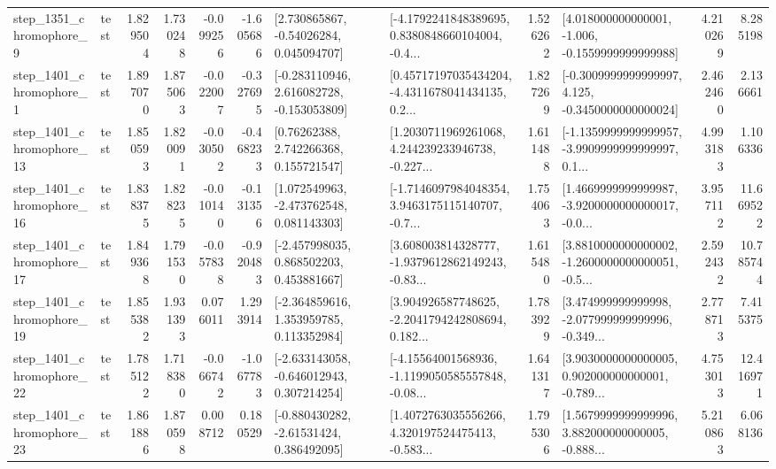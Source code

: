 \begin{tabular}{llrrrrllrlrr}
  step\_1351\_chromophore\_9 &      test &      1.829504 &    1.730248 &     -0.099256 & -1.605686 &     [2.730865867, -0.54026284, 0.045094707] &  [-4.1792241848389695, 0.8380848660104004, -0.4... &       1.526262 &   [4.018000000000001, -1.006, -0.1559999999999988] &            4.210269 &          8.285198 \\
  step\_1401\_chromophore\_1 &      test &      1.897070 &    1.875063 &     -0.022007 & -0.327695 &   [-0.283110946, 2.616082728, -0.153053809] &  [0.45717197035434204, -4.4311678041434135, 0.2... &       1.827269 &  [-0.3009999999999997, 4.125, -0.3450000000000024] &            2.462460 &          2.136661 \\
 step\_1401\_chromophore\_13 &      test &      1.850593 &    1.820091 &     -0.030502 & -0.468233 &      [0.76262388, 2.742266368, 0.155721547] &  [1.2030711969261068, 4.244239233946738, -0.227... &       1.611488 &  [-1.1359999999999957, -3.9909999999999997, 0.1... &            4.993183 &          1.106336 \\
 step\_1401\_chromophore\_16 &      test &      1.838375 &    1.828235 &     -0.010140 & -0.131356 &    [1.072549963, -2.473762548, 0.081143303] &  [-1.7146097984048354, 3.9463175115140707, -0.7... &       1.754063 &  [1.4669999999999987, -3.9200000000000017, -0.0... &            3.957112 &         11.669522 \\
 step\_1401\_chromophore\_17 &      test &      1.849368 &    1.791530 &     -0.057838 & -0.920483 &    [-2.457998035, 0.868502203, 0.453881667] &  [3.608003814328777, -1.9379612862149243, -0.83... &       1.615480 &  [3.8810000000000002, -1.2600000000000051, -0.5... &            2.592432 &         10.785744 \\
 step\_1401\_chromophore\_19 &      test &      1.855382 &    1.931393 &      0.076011 &  1.293914 &    [-2.364859616, 1.353959785, 0.113352984] &  [3.904926587748625, -2.2041794242808694, 0.182... &       1.783929 &  [3.474999999999998, -2.077999999999996, -0.349... &            2.778713 &          7.415375 \\
 step\_1401\_chromophore\_22 &      test &      1.785122 &    1.718380 &     -0.066742 & -1.067783 &   [-2.633143058, -0.646012943, 0.307214254] &  [-4.15564001568936, -1.1199050585557848, -0.08... &       1.641317 &  [3.9030000000000005, 0.902000000000001, -0.789... &            4.753013 &         12.416971 \\
 step\_1401\_chromophore\_23 &      test &      1.861886 &    1.870598 &      0.008712 &  0.180529 &    [-0.880430282, -2.61531424, 0.386492095] &  [1.4072763035556266, 4.320197524475413, -0.583... &       1.795306 &  [1.5679999999999996, 3.882000000000005, -0.888... &            5.210863 &          6.068136 \\

\end{tabular}
